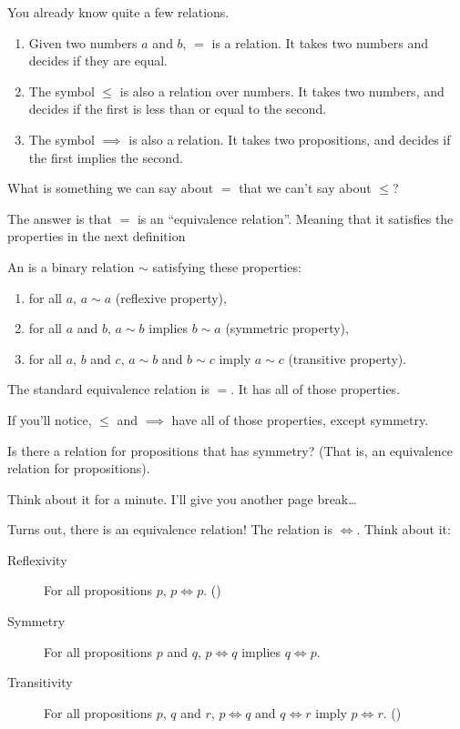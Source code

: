 You already know quite a few relations.

\begin{enumerate}
\item Given two numbers $a$ and $b$, $=$ is a relation. It takes two
  numbers and decides if they are equal.
\item The symbol $\le$ is also a relation over numbers. It takes two
  numbers, and decides if the first is less than or equal to the
  second.
\item The symbol $\implies$ is also a relation. It takes two
  propositions, and decides if the first implies the second.
\end{enumerate}

What is something we can say about $=$ that we can't say about $\le$?

The answer is that $=$ is an ``equivalence relation''. Meaning that it
satisfies the properties in the next definition

\begin{definition}
  An  is a binary relation $\sim$ satisfying
  these properties:

  \begin{enumerate}
  \item for all $a$, $a \sim a$ (reflexive property),
  \item for all $a$ and $b$, $a \sim b$ implies $b \sim a$ (symmetric
    property),
  \item for all $a$, $b$ and $c$, $a \sim b$ and $b \sim c$ imply
    $a \sim c$ (transitive property).
  \end{enumerate}
\end{definition}

The standard equivalence relation is $=$. It has all of those
properties.

If you'll notice, $\le$ and $\implies$ have all of those properties,
except symmetry.

Is there a relation for propositions that has symmetry? (That is, an
equivalence relation for propositions).

Think about it for a minute. I'll give you another page break\dots

\newpage

Turns out, there is an equivalence relation! The relation is
$\iff$. Think about it:

\begin{description}
\item[Reflexivity] For all propositions $p$, $p \iff
  p$. ()
\item[Symmetry] For all propositions $p$ and $q$, $p \iff q$ implies
  $q \iff p$.
\item[Transitivity] For all propositions $p$, $q$ and $r$, $p \iff q$
  and $q \iff r$ imply $p \iff r$. ()
\end{description}

